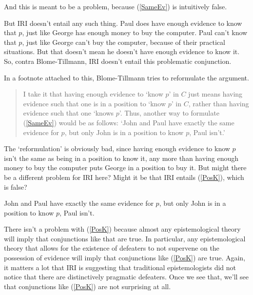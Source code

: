 \documentclass[11pt,oneside]{book}
\begin{document}
\noindent And this is meant to be a problem, because (\ref{SameEv}) is intuitively false.

But IRI doesn't entail any such thing. Paul does have enough evidence to know that $p$, just like George has enough money to buy the computer. Paul can't know that $p$, just like George can't buy the computer, because of their practical situations. But that doesn't mean he doesn't have enough evidence to know it. So, contra Blome-Tillmann, IRI doesn't entail this problematic conjunction.

In a footnote attached to this, Blome-Tillmann tries to reformulate the argument.

\begin{quote}
\noindent I take it that having enough evidence to `know $p$' in $C$ just means having evidence such that one is in a position to `know $p$' in $C$, rather than having evidence such that one `knows $p$'. Thus, another way to formulate (\ref{SameEv}) would be as follows: `John and Paul have exactly the same evidence for $p$, but only John is in a position to know $p$, Paul isn't.'
\end{quote}

\noindent The `reformulation' is obviously bad, since having enough evidence to know $p$ isn't the same as being in a position to know it, any more than having enough money to buy the computer puts George in a position to buy it. But might there be a different problem for IRI here? Might it be that IRI entails (\ref{PosK}), which is false?

\begin{exe}
\ex\label{PosK} John and Paul have exactly the same evidence for $p$, but only John is in a position to know $p$, Paul isn't.
\end{exe}

\noindent There isn't a problem with (\ref{PosK}) because almost any epistemological theory will imply that conjunctions like that are true. In particular, any epistemological theory that allows for the existence of defeaters to not supervene on the possession of evidence will imply that conjunctions like (\ref{PosK}) are true. Again, it matters a lot that IRI is suggesting that traditional epistemologists did not notice that there are distinctively pragmatic defeaters. Once we see that, we'll see that conjunctions like (\ref{PosK}) are not surprising at all.
\end{document}
